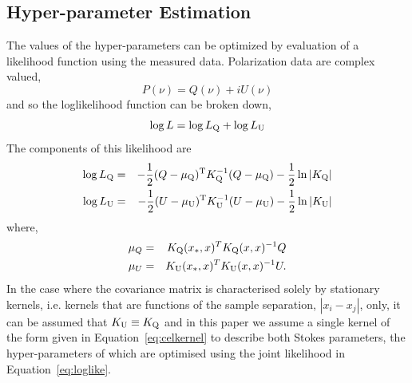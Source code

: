 \documentclass[fleqn,usenatbib]{mnras}
\begin{document}
\subsection{Hyper-parameter Estimation}
\label{sec:parms}

The values of the hyper-parameters can be optimized by evaluation of a likelihood function using the measured data. Polarization data are complex valued,
%
\begin{equation}
P(\nu) = Q(\nu) + iU(\nu)
\end{equation}
%
and so the loglikelihood function can be broken down,
%
\begin{equation}
\label{eq:loglike}
\log L = \log L_{\rm Q} + \log L_{\rm U}
\end{equation}
%
The components of this likelihood are
%
\begin{eqnarray}
\log L_{\rm Q} &=& -\frac{1}{2}(Q - \mu_{\rm Q})^{\rm T}K_{\rm Q}^{-1}(Q - \mu_{\rm Q}) - \frac{1}{2}\ln |K_{\rm Q}|\\
\log L_{\rm U} &=& -\frac{1}{2}(U - \mu_{\rm U})^{\rm T}K_{\rm U}^{-1}(U - \mu_{\rm U}) - \frac{1}{2}\ln |K_{\rm U}|
\end{eqnarray}
%
where,
%
\begin{eqnarray}
\mu_{Q} &=& K_{\rm Q}(x_{\ast},x)^T K_{\rm Q}(x,x)^{-1} Q\\
\mu_{U} &=& K_{\rm U}(x_{\ast},x)^T K_{\rm U}(x,x)^{-1} U.
\end{eqnarray}
%
In the case where the covariance matrix is characterised solely by stationary kernels, i.e. kernels that are functions of the sample separation, $|x_i - x_j|$, only, it can be assumed that $K_{\rm U}\equiv K_{\rm Q}$ and in this paper we assume a single kernel of the form given in Equation~\ref{eq:celkernel} to describe both Stokes parameters, the hyper-parameters of which are optimised using the joint likelihood in Equation~\ref{eq:loglike}.


\end{document}
